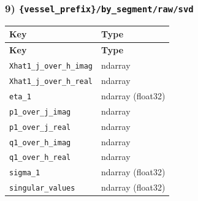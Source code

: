 \documentclass[11pt]{article}
\begin{document}
\subsubsection*{9) \texttt{\{vessel\_\allowbreak{}prefix\}/\allowbreak{}by\_\allowbreak{}segment/\allowbreak{}raw/\allowbreak{}svd}}
\begin{longtable}{|p{}|p{}|}
\hline
\textbf{Key} & \textbf{Type} \\ \hline
\endfirsthead
\hline
\textbf{Key} & \textbf{Type} \\ \hline
\endhead
\texttt{Xhat1\_\allowbreak{}j\_\allowbreak{}over\_\allowbreak{}h\_\allowbreak{}imag} & ndarray \\ \hline
\texttt{Xhat1\_\allowbreak{}j\_\allowbreak{}over\_\allowbreak{}h\_\allowbreak{}real} & ndarray \\ \hline
\texttt{eta\_\allowbreak{}1} & ndarray (float32) \\ \hline
\texttt{p1\_\allowbreak{}over\_\allowbreak{}j\_\allowbreak{}imag} & ndarray \\ \hline
\texttt{p1\_\allowbreak{}over\_\allowbreak{}j\_\allowbreak{}real} & ndarray \\ \hline
\texttt{q1\_\allowbreak{}over\_\allowbreak{}h\_\allowbreak{}imag} & ndarray \\ \hline
\texttt{q1\_\allowbreak{}over\_\allowbreak{}h\_\allowbreak{}real} & ndarray \\ \hline
\texttt{sigma\_\allowbreak{}1} & ndarray (float32) \\ \hline
\texttt{singular\_\allowbreak{}values} & ndarray (float32) \\ \hline
\end{longtable}
\end{document}
